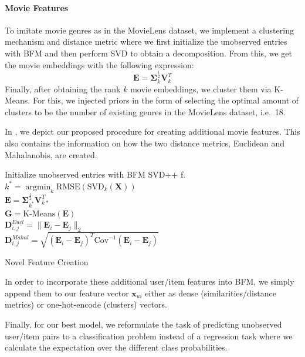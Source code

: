 \documentclass[10pt,conference,compsocconf]{IEEEtran}
\DeclareMathOperator*{\argmin}{argmin}   %
\begin{document}
    \paragraph{Movie Features}
    To imitate movie genres as in the MovieLens dataset, we implement a clustering mechanism and distance metric where we first initialize the unobserved entries with BFM and then perform SVD to obtain a decomposition.
    From this, we get the movie embeddings with the following expression:
    $$\mathbf{E}=\mathbf{\Sigma}_k ^{\frac{1}{2}} \mathbf{V}_k ^T$$
    Finally, after obtaining the rank $k$ movie embeddings, we cluster them via K-Means.
    For this, we injected priors in the form of selecting the optimal amount of clusters to be the number of existing genres in the MovieLens dataset, i.e.~18.

    In , we depict our proposed procedure for creating additional movie features.
    This also contains the information on how the two distance metrics, Euclidean and Mahalanobis, are created.

    \begin{algorithm}
        Initialize unobserved entries with BFM SVD++ f.\\
        $k^*=\argmin_{k} \text{RMSE}(\text{SVD}_{k}(\mathbf{X}))$\\
        $\mathbf{E} = \mathbf{\Sigma}^{\frac{1}{2}}_{k^*}\mathbf{V}_{k*}^T$ \\
        $\mathbf{G} = \text{K-Means}(\mathbf{E})$ \\
         {
         {
        $\mathbf{D}_{i,j} ^{Eucl} = \|\mathbf{E}_i - \mathbf{E}_j\|_2$ \\
        $\mathbf{D}_{i,j} ^{Mahal} = \sqrt{(\mathbf{E}_i-\mathbf{E}_j)^T\text{Cov}^{-1}(\mathbf{E}_i-\mathbf{E}_j)}$
        }
            }
            \caption{Novel Feature Creation}
            \label{alg:algo1}
    \end{algorithm}

    In order to incorporate these additional user/item features into BFM, we simply append them to our feature vector $\mathbf{x}_{ui}$ either as dense (similarities/distance metrics) or one-hot-encode (clusters) vectors.

    Finally, for our best model, we reformulate the task of predicting unobserved user/item pairs to a classification problem instead of a regression task where we calculate the expectation over the different class probabilities.
\end{document}
